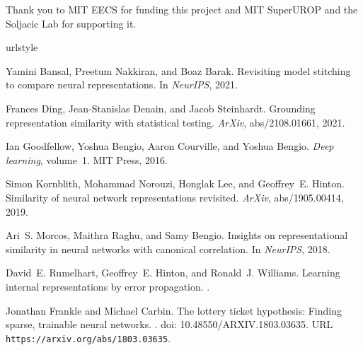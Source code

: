 \documentclass{article}
\begin{document}
\begin{ack}
Thank you to MIT EECS for funding this project and MIT SuperUROP and the Soljacic Lab for supporting it.
\end{ack}

\small
\begin{thebibliography}{6}
  \providecommand{\natexlab}[1]{#1}
  \providecommand{\url}[1]{\texttt{#1}}
  \expandafter\ifx\csname urlstyle\endcsname\relax
    \providecommand{\doi}[1]{doi: #1}\else
    \providecommand{\doi}{doi: \begingroup \urlstyle{rm}\Url}\fi
  
  Yamini Bansal, Preetum Nakkiran, and Boaz Barak.
  \newblock Revisiting model stitching to compare neural representations.
  \newblock In \emph{NeurIPS}, 2021.
  
  Frances Ding, Jean-Stanislas Denain, and Jacob Steinhardt.
  \newblock Grounding representation similarity with statistical testing.
  \newblock \emph{ArXiv}, abs/2108.01661, 2021.
  
  Ian Goodfellow, Yoshua Bengio, Aaron Courville, and Yoshua Bengio.
  \newblock \emph{Deep learning}, volume~1.
  \newblock MIT Press, 2016.
  
  Simon Kornblith, Mohammad Norouzi, Honglak Lee, and Geoffrey~E. Hinton.
  \newblock Similarity of neural network representations revisited.
  \newblock \emph{ArXiv}, abs/1905.00414, 2019.
  
  Ari~S. Morcos, Maithra Raghu, and Samy Bengio.
  \newblock Insights on representational similarity in neural networks with
    canonical correlation.
  \newblock In \emph{NeurIPS}, 2018.
  
  David~E. Rumelhart, Geoffrey~E. Hinton, and Ronald~J. Williams.
  \newblock Learning internal representations by error propagation.
  .

  Jonathan Frankle and Michael Carbin.
  \newblock The lottery ticket hypothesis: Finding sparse, trainable neural
    networks.
  .
  \newblock \doi{10.48550/ARXIV.1803.03635}.
  \newblock URL \url{https://arxiv.org/abs/1803.03635}.


\end{thebibliography}
\end{document}
